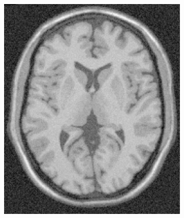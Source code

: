 \documentclass[11pt,twocolumn,twoside]{opticajnl}
\begin{document}
\begin{figure}[h]
\begin{subfigure}[h]{0.24\linewidth}
         \end{subfigure}
                 \caption{Difererencia entre la imagen original y la imagen binarizada.} 
                 \label{fig:binary_sustraction}
        \begin{subfigure}[h]{0.24\linewidth}
            \centering
            \includegraphics[width=\textwidth]{Figuras/ImageA_exp_gamma=0.5.png}
        \end{subfigure}
        \begin{subfigure}[h]{0.24\linewidth}
            \centering

\end{subfigure}
\end{figure}
\end{document}
